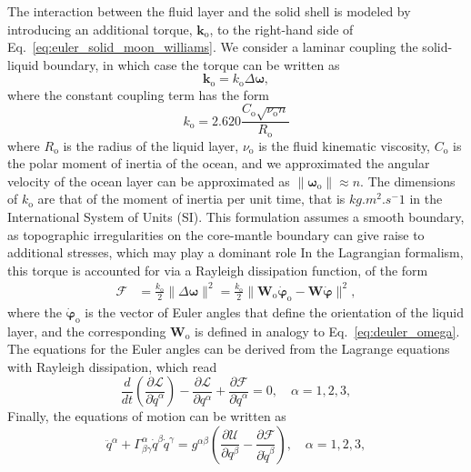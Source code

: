 \documentclass[pdflatex,sn-mathphys-num]{sn-jnl}%
\theoremstyle{thmstyleone}%
\theoremstyle{thmstyletwo}%
\theoremstyle{thmstylethree}%
\let\unit\si
\renewcommand{\vec}[1]{\boldsymbol{#1}}
\begin{document}
The interaction between the fluid layer and the solid shell is modeled by introducing an additional torque, $\vec{k}_{\mathrm{o}}$, to the right-hand side of Eq.~\eqref{eq:euler_solid_moon_williams}. 
%
We consider a laminar coupling the solid-liquid boundary, in which case the torque can be written as \citep{1981RSPTA.303..327Y} %
%
\begin{equation}
	\vec{k}_{\mathrm{o}} =
	k_\mathrm{o}  \Delta \vec{\omega},
\end{equation}
%
where the constant coupling term has the form \citep{1981RSPTA.303..327Y, 1995Icar..117..250Y, 1968JFM....33..739B, 1965PCPS...61..279R}
\begin{equation}
	k_\mathrm{o} = 2.620  \frac{C_\mathrm{o} \sqrt{\nu_\mathrm{o} n}}{R_\mathrm{o}}
\end{equation}
where $R_\mathrm{o}$ is the radius of the liquid layer, $\nu_\mathrm{o}$ is the fluid kinematic viscosity, $C_\mathrm{o}$ is the polar moment of inertia of the ocean, and we approximated the angular velocity of the ocean layer can be approximated as $\|\vec{\omega}_\mathrm{o}\| \approx n$.
The dimensions of $k_\mathrm{o}$ are that of the moment of inertia per unit time, that is $\unit{kg.m^2.s^-1}$ in the International System of Units (SI).
%
This formulation assumes a smooth boundary, as topographic irregularities on the core-mantle
boundary can give raise to additional stresses, which may play a dominant role \citep[see e.g.,][]{1981RSPTA.303..327Y}
%
In the Lagrangian formalism, this torque is accounted for via a Rayleigh dissipation function, of the form
\begin{align}
\mathcal{F} &= \frac{k_\mathrm{o}}{2}  \| \Delta \vec{\omega} \|^2
= 
\frac{k_\mathrm{o}}{2}  \| \vec{W}_{\mathrm{o}}\dot{\vec{\varphi}}_{\mathrm{o}} - \vec{W}\dot{\vec{\varphi}} \|^2,
\end{align}
%
where the $\dot{\vec{\varphi}}_{\mathrm{o}}$ is the vector of Euler angles that define the orientation of the liquid layer, and the corresponding $\vec{W}_{\mathrm{o}}$ is defined in analogy to Eq.~\eqref{eq:deuler_omega}.
%
The equations for the Euler angles can be derived from the Lagrange equations with Rayleigh dissipation, which read
%
\begin{equation}
	\frac{d}{dt}\left(\frac{\partial \mathcal{L}}{\partial \dot{q}^\alpha}\right) - \frac{\partial \mathcal{L}}{\partial q^\alpha}  
+ \frac{\partial \mathcal{F}}{\partial \dot{q}^\alpha}= 0, \quad \alpha = 1, 2,3,
\end{equation}
%
%
%
Finally, the equations of motion can be written as
\begin{equation}\label{eq_geodesic_potential_ocean_V2}
	\ddot{q}^\alpha + 
	\Gamma^{\alpha}_{\beta\gamma} \dot{q}^\beta \dot{q}^\gamma =
	g^{\alpha\beta} \left( \frac{\partial \mathcal{U}}{\partial q^\beta} - \frac{\partial \mathcal{F}}{\partial \dot{q}^\beta} \right), \quad \alpha = 1,2,3,
\end{equation}
\end{document}
